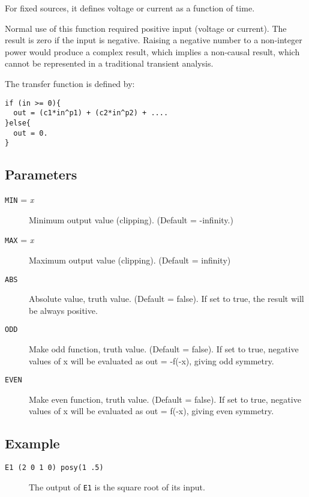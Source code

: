 For fixed sources, it defines voltage or current as a function of
time.

Normal use of this function required positive input (voltage or
current).  The result is zero if the input is negative.  Raising a
negative number to a non-integer power would produce a complex result, 
which implies a non-causal result, which cannot be represented in a
traditional transient analysis.

The transfer function is defined by:

\begin{verbatim}
if (in >= 0){
  out = (c1*in^p1) + (c2*in^p2) + ....
}else{
  out = 0.
}
\end{verbatim}
\subsection{Parameters}

\begin{description}
  
\item[{\tt MIN} = {\it x}] Minimum output value (clipping).  (Default
  = -infinity.)

\item[{\tt MAX} = {\it x}] Maximum output value (clipping).  (Default
  = infinity)

\item[{\tt ABS}] Absolute value, truth value.  (Default = false).  If
  set to true, the result will be always positive.

\item[{\tt ODD}] Make odd function, truth value.  (Default = false).
  If set to true, negative values of x will be evaluated as out =
  -f(-x), giving odd symmetry.
  
\item[{\tt EVEN}] Make even function, truth value.  (Default = false).
  If set to true, negative values of x will be evaluated as out =
  f(-x), giving even symmetry.


\end{description}
\subsection{Example} 

\begin{description}

\item[{\tt E1 (2 0 1 0) posy(1 .5)}] The output of {\tt E1} is the
square root of its input.

\end{description}
